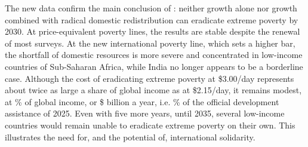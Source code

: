 The new data confirm the main conclusion of \cite{fabre_shortfall_2025}: neither growth alone nor growth combined with radical domestic redistribution can eradicate extreme poverty by 2030. At price-equivalent poverty lines, the results are stable despite the renewal of most surveys. At the new international poverty line, which sets a higher bar, the shortfall of domestic resources is more severe and concentrated in low-income countries of Sub-Saharan Africa, while India no longer appears to be a borderline case. Although the cost of eradicating extreme poverty at \$3.00/day represents about twice as large a share of global income as at \$2.15/day, it remains modest, at \upGapThree\% of global income, or \$\upGapBnUSD{} billion a year, i.e. \upGapShareODA\% of the official development assistance of 2025. Even with five more years, until 2035, several low-income countries would remain unable to eradicate extreme poverty on their own. This illustrates the need for, and the potential of, international solidarity.
